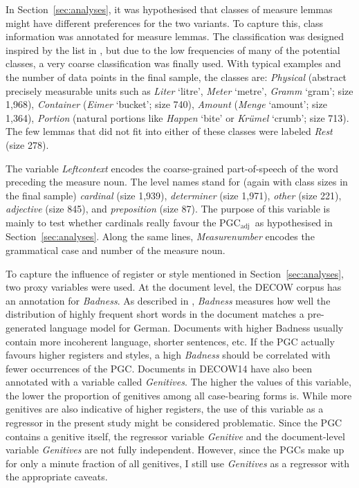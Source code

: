 \documentclass[USenglish]{article}
\newcommand{\Sub}[1]{\ensuremath{\mathrm{_{#1}}}}
\newcommand{\PGCa}{PGC\Sub{adj}}
\begin{document}
In Section~\ref{sec:analyses}, it was hypothesised that classes of measure lemmas might have different preferences for the two variants.
To capture this, class information was annotated for measure lemmas.
The classification was designed inspired by the list in \cite[530]{Koptjevskaja2001}, but due to the low frequencies of many of the potential classes, a very coarse classification was finally used.
With typical examples and the number of data points in the final sample, the classes are:
\textit{Physical} (abstract precisely measurable units such as \textit{Liter} `litre', \textit{Meter} `metre', \textit{Gramm} `gram'; size 1,968),
\textit{Container} (\textit{Eimer} `bucket'; size 740), 
\textit{Amount} (\textit{Menge} `amount'; size 1,364), 
\textit{Portion} (natural portions like \textit{Happen} `bite' or \textit{Krümel} `crumb'; size 713).
The few lemmas that did not fit into either of these classes were labeled \textit{Rest} (size 278).

The variable \textit{Leftcontext} encodes the coarse-grained part-of-speech of the word preceding the measure noun.
The level names stand for (again with class sizes in the final sample) \textit{cardinal} (size 1,939), \textit{determiner} (size 1,971), \textit{other} (size 221), \textit{adjective} (size 845), and \textit{preposition} (size 87).
The purpose of this variable is mainly to test whether cardinals really favour the \PGCa\ as hypothesised in Section~\ref{sec:analyses}.
Along the same lines, \textit{Measurenumber} encodes the grammatical case and number of the measure noun.

To capture the influence of register or style mentioned in Section~\ref{sec:analyses}, two proxy variables were used.
At the document level, the DECOW corpus has an annotation for \textit{Badness}.
As described in \cite{SchaeferEa2013}, \textit{Badness} measures how well the distribution of highly frequent short words in the document matches a pre-generated language model for German.
Documents with higher Badness usually contain more incoherent language, shorter sentences, etc.
If the PGC actually favours higher registers and styles, a high \textit{Badness} should be correlated with fewer occurrences of the PGC.
Documents in DECOW14 have also been annotated with a variable called \textit{Genitives}.
The higher the values of this variable, the lower the proportion of genitives among all case-bearing forms is.
While more genitives are also indicative of higher registers, the use of this variable as a regressor in the present study might be considered problematic.
Since the PGC contains a genitive itself, the regressor variable \textit{Genitive} and the document-level variable \textit{Genitives} are not fully independent.
However, since the PGCs make up for only a minute fraction of all genitives, I still use \textit{Genitives} as a regressor with the appropriate caveats.
\end{document}
